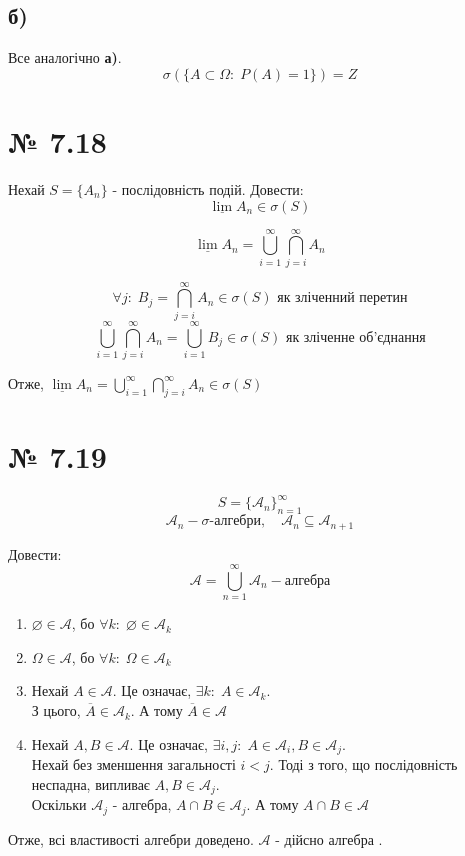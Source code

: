 \documentclass[11pt, a4paper]{article} %
\begin{document}
\subsection*{б)}
Все аналогічно \textbf{а)}. 
$$\sigma(\{A\subset\Omega:\; P(A)=1\}) = Z$$
\pagebreak

\section*{№ 7.18}
\begin{mdframed}
    Нехай $S = \{A_n\}$ - послідовність подій.
    Довести:
    $$\underline{\lim} A_n \in \sigma(S)$$
\end{mdframed}

$$\underline{\lim} A_n = \bigcup_{i=1}^\infty \bigcap_{j=i}^\infty A_n$$

$$\forall j:\; B_j = \bigcap_{j=i}^\infty A_n \in \sigma(S) \text{ як зліченний перетин}$$
$$\bigcup_{i=1}^\infty \bigcap_{j=i}^\infty A_n = \bigcup_{i=1}^\infty B_j \in \sigma(S) \text{ як зліченне об'єднання}$$ 

Отже, $\underline{\lim} A_n = \bigcup_{i=1}^\infty \bigcap_{j=i}^\infty A_n \in \sigma(S)$ \qedsymbol

\section*{№ 7.19}
\begin{mdframed}
    $$S = \left.\{\mathcal{A}_n\}\right._{n=1}^\infty$$
    $$\mathcal{A}_n - \sigma\text{-алгебри},\quad\mathcal{A}_n \subseteq \mathcal{A}_{n+1}$$

    Довести:
    $$\mathcal{A} = \bigcup_{n=1}^\infty \mathcal{A}_n - \text{алгебра}$$
\end{mdframed}

\begin{enumerate}
    \item $\varnothing \in \mathcal{A}$, бо $\forall k:\; \varnothing \in \mathcal{A}_k$
    \item $\Omega \in \mathcal{A}$, бо $\forall k:\; \Omega \in \mathcal{A}_k$
    \item Нехай $A \in \mathcal{A}$. 
    Це означає, $\exists k:\; A \in \mathcal{A}_k$.\\
    З цього, $\overline{A} \in \mathcal{A}_k$. 
    А тому $\overline{A} \in \mathcal{A}$
    \item Нехай $A,B \in \mathcal{A}$. 
    Це означає, $\exists i,j:\; A \in \mathcal{A}_i, B \in \mathcal{A}_j$.\\
    Нехай без зменшення загальності $i < j$. 
    Тоді з того, що послідовність неспадна, випливає
    $A,B \in \mathcal{A}_j$. \\
    Оскільки $\mathcal{A}_j$ - алгебра,
    $A \cap B \in \mathcal{A}_j$.
    А тому $A \cap B \in \mathcal{A}$
\end{enumerate}

Отже, всі властивості алгебри доведено. $\mathcal{A}$ - дійсно алгебра \qedsymbol.
\end{document}
